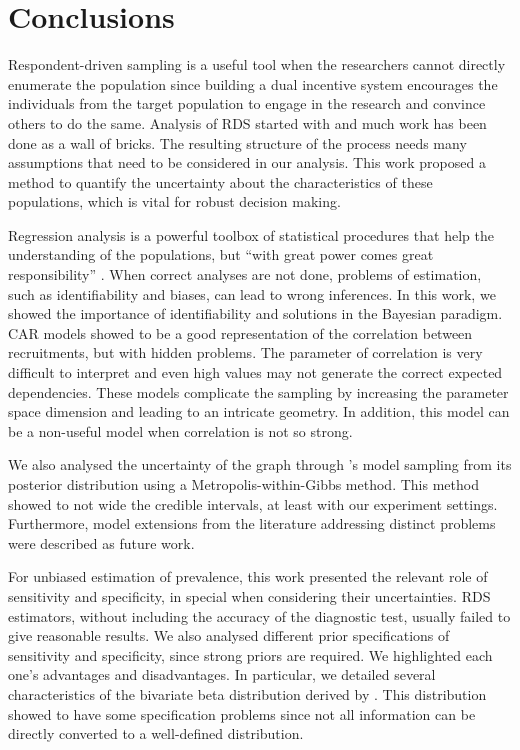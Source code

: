 \chapter{Conclusions}
\label{ch:conclusions}

Respondent-driven sampling is a useful tool when the researchers cannot directly enumerate the population since building a dual incentive system encourages the individuals from the target population to engage in the research and convince others to do the same. Analysis of RDS started with \textcite{heckathorn1997} and much work has been done as a wall of bricks. The resulting structure of the process needs many assumptions that need to be considered in our analysis. This work proposed a method to quantify the uncertainty about the characteristics of these populations, which is vital for robust decision making.  

Regression analysis is a powerful toolbox of statistical procedures that help the understanding of the populations, but ``with great power comes great responsibility'' \cite[p. 13]{spider_man}. When correct analyses are not done, problems of estimation, such as identifiability and biases, can lead to wrong inferences. In this work, we showed the importance of identifiability and solutions in the Bayesian paradigm. CAR models showed to be a good representation of the correlation between recruitments, but with hidden problems. The parameter of correlation is very difficult to interpret and even high values may not generate the correct expected dependencies. These models complicate the sampling by increasing the parameter space dimension and leading to an intricate geometry. In addition, this model can be a non-useful model when correlation is not so strong. 

We also analysed the uncertainty of the graph through
\textcite{crawford2016}'s model sampling from its posterior distribution using
a Metropolis-within-Gibbs method. This method showed to not wide the credible
intervals, at least with our experiment settings. Furthermore, model
extensions from the literature addressing distinct problems were described as
future work. 

For unbiased estimation of prevalence, this work presented the relevant role
of sensitivity and specificity, in special when considering their
uncertainties. RDS estimators, without including the accuracy of the
diagnostic test, usually failed to give reasonable results. We also analysed
different prior specifications of sensitivity and specificity, since strong
priors are required. We highlighted each one's advantages and disadvantages.
In particular, we detailed several characteristics of the bivariate beta
distribution derived by \textcite{olkin2015constructions}. This distribution
showed to have some specification problems since not all information can be
directly converted to a well-defined distribution.  
 
